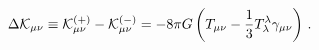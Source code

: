 \begin{equation}
\Delta {\cal{K}}_{\mu\nu}\equiv {\cal{K}}_{\mu\nu}^{(+)}-
{\cal{K}}_{\mu\nu}^{(-)}=-8\pi G\left(T_{\mu\nu}-\frac{1}{3}
T_{\lambda}^{\lambda}\gamma_{\mu\nu}\right)\,.
\end{equation}

